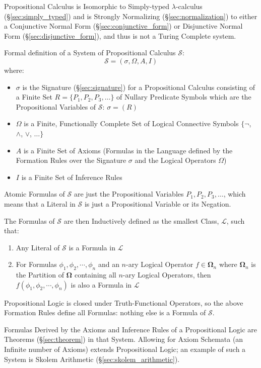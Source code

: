Propositional Calculus is Isomorphic to Simply-typed $\lambda$-calculus
(\S\ref{sec:simply_typed}) and is Strongly Normalizing
(\S\ref{sec:normalization}) to either a Conjunctive Normal Form
(\S\ref{sec:conjunctive_form}) or Disjunctive Normal Form
(\S\ref{sec:disjunctive_form}), and thus is not a Turing Complete system.

Formal definition of a System of Propositional Calculus $\mathcal{S}$:
\[
    \mathcal{S} = (\sigma, \Omega, A, I)
\]
where:
\begin{itemize}
  \item $\sigma$ is the Signature (\S\ref{sec:signature}) for a Propositional
    Calculus consisting of a Finite Set $R = \{P_1, P_2, P_3, \ldots\}$ of
    Nullary Predicate Symbols which are the Propositional Variables of
    $\mathcal{S}$: $\sigma = (R)$
  \item $\Omega$ is a Finite, Functionally Complete Set of Logical Connective
    Symbols $\{\neg$, $\wedge$, $\vee$, $\ldots\}$
  \item $A$ is a Finite Set of Axioms (Formulas in the Language defined by the
    Formation Rules over the Signature $\sigma$ and the Logical Operators
    $\Omega$)
  \item $I$ is a Finite Set of Inference Rules
\end{itemize}
Atomic Formulas of $\mathcal{S}$ are just the Propositional Variables
$P_1, P_2, P_3, \ldots$, which means that a Literal in $\mathcal{S}$
is just a Propositional Variable or its Negation.

The Formulas of $\mathcal{S}$ are then Inductively defined as the smallest
Class, $\mathcal{L}$, such that:
\begin{enumerate}
  \item Any Literal of $\mathcal{S}$ is a Formula in $\mathcal{L}$
  \item For Formulas $\phi_1, \phi_2, \cdots, \phi_n$ and an $n$-ary
    Logical Operator $f \in \mathbf{\Omega}_n$ where $\mathbf{\Omega}_n$
    is the Partition of $\mathbf{\Omega}$ containing all $n$-ary Logical
    Operators, then $f(\phi_1, \phi_2, \cdots, \phi_n)$ is also a
    Formula in $\mathcal{L}$
\end{enumerate}
Propositional Logic is closed under Truth-Functional Operators, so the
above Formation Rules define all Formulas: nothing else is a Formula
of $\mathcal{S}$.

Formulas Derived by the Axioms and Inference Rules of a Propositional Logic are
Theorems (\S\ref{sec:theorem}) in that System. Allowing for Axiom Schemata (an
Infinite number of Axioms) extends Propositional Logic; an example of such a
System is Skolem Arithmetic (\S\ref{sec:skolem_arithmetic}).

